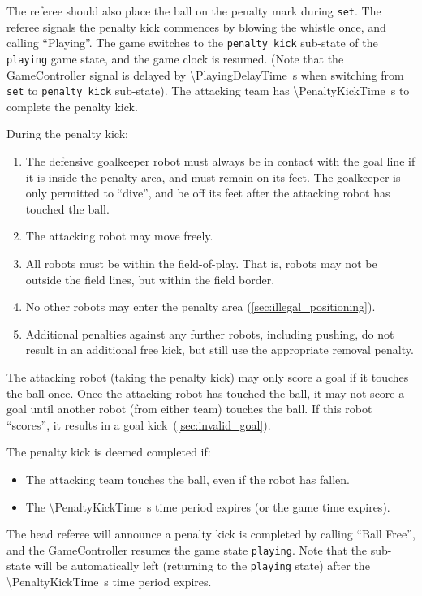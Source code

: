 The referee should also place the ball on the penalty mark during \texttt{set}.
The referee signals the penalty kick commences by blowing the whistle once, and calling ``Playing''.
The game switches to the \texttt{penalty kick} sub-state of the \texttt{playing} game state, and the game clock is resumed.
(Note that the GameController signal is delayed by \qty{\PlayingDelayTime}{\second} when switching from \texttt{set} to \texttt{penalty kick} sub-state).
The attacking team has \qty{\PenaltyKickTime}{\second} to complete the penalty kick.

During the penalty kick:
\begin{enumerate}
  \item The defensive goalkeeper robot must always be in contact with the goal line if it is inside the penalty area, and must remain on its feet.
    The goalkeeper is only permitted to ``dive'', and be off its feet after the attacking robot has touched the ball.
  \item The attacking robot may move freely.
  \item All robots must be within the field-of-play.
    That is, robots may not be outside the field lines, but within the field border.
  \item No other robots may enter the penalty area (\cf \cref{sec:illegal_positioning}).
  \item Additional penalties against any further robots, including pushing, do not result in an additional free
    kick, but still use the appropriate removal penalty.
\end{enumerate}

The attacking robot (taking the penalty kick) may only score a goal if it touches the ball once.
Once the attacking robot has touched the ball, it may not score a goal until another robot (from either team) touches the ball.
If this robot ``scores'', it results in a goal kick~(\cf \cref{sec:invalid_goal}).

The penalty kick is deemed completed if:
\begin{itemize}
  \item The attacking team touches the ball, even if the robot has fallen.
  \item The \qty{\PenaltyKickTime}{\second} time period expires (or the game time expires).
\end{itemize}

The head referee will announce a penalty kick is completed by calling ``Ball Free'', and the GameController resumes the game state \texttt{playing}.
Note that the sub-state will be automatically left (returning to the \texttt{playing} state) after the \qty{\PenaltyKickTime}{\second} time period expires.

